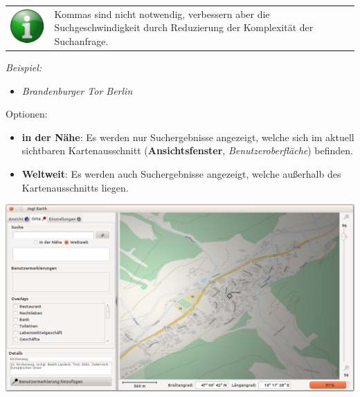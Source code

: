 \documentclass[10pt]{scrreprt}
\newcommand{\textref}[1]{\mbox{\raisebox{0.1ex}{\small$\rightarrow$ }\textit{#1}}}
\begin{document}
\vspace{5mm}
\begin{tabular}{>{\centering \arraybackslash}m{1cm} m{14cm}}
\includegraphics[scale=0.5]{images/info.eps} & Kommas sind nicht notwendig, verbessern aber die Suchgeschwindigkeit durch Reduzierung der Komplexität der Suchanfrage. \\ 
\end{tabular} 

\vspace{3mm}
\textit{Beispiel:}
\begin{itemize}
\item \textit{Brandenburger Tor Berlin}
\end{itemize}

\vspace{3mm}
Optionen:
\begin{itemize}
\item \textbf{in der Nähe}: Es werden nur Suchergebnisse angezeigt, welche sich im aktuell sichtbaren Kartenausschnitt (\textbf{Ansichtsfenster}, \textref{Benutzeroberfläche}) befinden.
\item \textbf{Weltweit}: Es werden auch Suchergebnisse angezeigt, welche außerhalb des Kartenausschnitts liegen.
\end{itemize}

\vspace{3mm}
\begin{center}
\includegraphics[scale=0.25]{images/Benutzermarkierungs_Dialog3.png}
\end{center}
\end{document}
